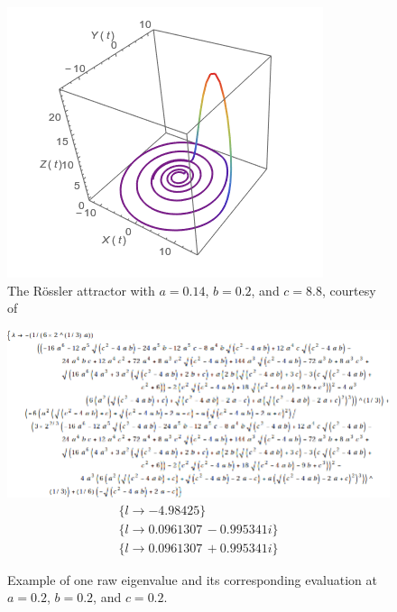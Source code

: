 \documentclass{article}
\begin{document}
\begin{figure}[h]
	\centering
	\includegraphics[scale=0.7]{attractor_a0p14_b0p2_c8p8}
	\caption{The R\"{o}ssler attractor with $a=0.14$, $b=0.2$, and $c=8.8$, courtesy of \cite{rossler_wf}}
	\label{fig:3dsys_02}
\end{figure}

\begin{figure}[h]
	\centering
	\includegraphics[scale=0.5]{messy_output}
	\begin{gather*}
		\{l\to -4.98425\}\\
		\{l\to 0.0961307\, -0.995341 i\}\\
		\{l\to 0.0961307\, +0.995341 i\}
	\end{gather*}
	\caption{Example of one raw eigenvalue and its corresponding evaluation at $a=0.2$, $b=0.2$, and $c=0.2$.}
	\label{fig:raw_ev}
\end{figure}
\end{document}
